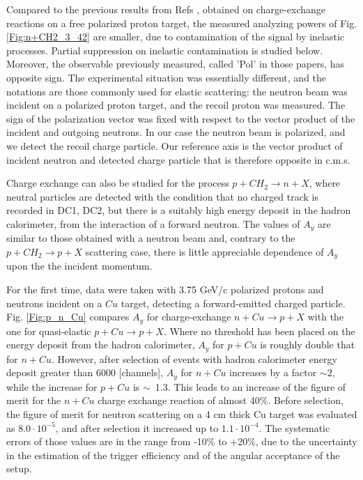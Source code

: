 \documentclass[twocolumn,epjc3]{svjour3}
\begin{document}
Compared to the previous results from Refs \cite{PhysRevLett.30.1183,Robrish:1970jw}, obtained on charge-exchange reactions on a free polarized proton target, the measured analyzing powers of Fig. \ref{Fig:n+CH2_3_42} are smaller, due to contamination of the signal by inelastic processes.  Partial suppression on inelastic contamination is studied below. Moreover, the observable previously measured, called 'Pol' in those papers, has opposite sign. The experimental situation was essentially different, and the notations are those commonly used for elastic scattering: the neutron beam was incident on a polarized proton target, and the recoil proton was measured. The sign of the polarization vector was fixed with respect to the vector product of the incident and outgoing neutrons.  In our case the neutron beam is polarized, and we detect the recoil charge particle. Our reference axis is the vector product of incident neutron and detected charge particle that is therefore opposite in c.m.s.

Charge exchange can also be studied for the process $p+CH_2\to n+X$, where neutral particles are detected with the condition that no charged track is recorded in DC1, DC2, but there is a suitably high energy deposit in the hadron calorimeter, from the interaction of a forward neutron. The values of $A_y$ are similar to those obtained with a neutron beam and, contrary to the $p+CH_2\to p+X$ scattering case, there is little appreciable dependence of $A_y$ upon the the incident momentum.

For the first time, data were taken with 3.75 GeV/c polarized protons and neutrons incident on a $Cu$ target, detecting a forward-emitted charged particle. Fig. \ref{Fig:p_n_Cu} compares $A_y$ for charge-exchange $n+Cu\to p+X$ with the one for quasi-elastic $p+Cu\to p+X$. Where no threshold has been placed on the energy deposit from the hadron calorimeter, $A_y$ for $p+Cu$ is roughly double that for $n+Cu$. However, after selection of events with hadron calorimeter energy deposit greater than 6000 [channels], $A_y$ for $n+Cu$ increases by a factor $\sim 2$, while the increase for $p+Cu$ is $\sim$~1.3. This leads to an increase of the figure of merit for the $n+Cu$ charge exchange reaction of almost 40\%. Before selection, the figure of merit for neutron scattering on a 4 cm thick Cu target was evaluated as $8.0 \cdot 10^{-5}$, and after selection it increased up to $1.1 \cdot 10^{-4}$.  The systematic errors of those values are in the range from -10\% to +20\%, due to the uncertainty in the estimation of the trigger efficiency and of the angular acceptance of the setup.
\end{document}
